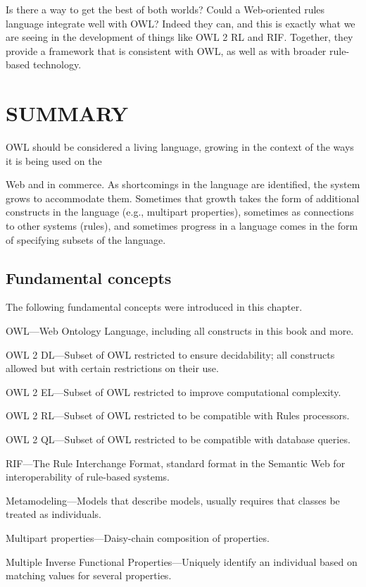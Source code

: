 Is there a way to get the best of both worlds? Could a Web-oriented
rules language integrate well with OWL? Indeed they can, and this is
exactly what we are seeing in the development of things like OWL 2 RL
and RIF. Together, they provide a framework that is consistent with OWL,
as well as with broader rule-based technology.

\section{SUMMARY}

OWL should be considered a living language, growing in the context of
the ways it is being used on the

Web and in commerce. As shortcomings in the language are identified, the
system grows to
accommodate them. Sometimes that growth takes the form of additional
constructs in the language (e.g., multipart properties), sometimes as
connections to other systems (rules), and sometimes progress in a
language comes in the form of specifying subsets of the language.

\subsection{Fundamental concepts}

The following fundamental concepts were introduced in this chapter.

OWL---Web Ontology Language, including all constructs in this book and
more.

OWL 2 DL---Subset of OWL restricted to ensure decidability; all
constructs allowed but with certain restrictions on their use.

OWL 2 EL---Subset of OWL restricted to improve computational complexity.

OWL 2 RL---Subset of OWL restricted to be compatible with Rules
processors.

OWL 2 QL---Subset of OWL restricted to be compatible with database
queries.

RIF---The Rule Interchange Format, standard format in the Semantic Web
for interoperability of rule-based systems.

Metamodeling---Models that describe models, usually requires that
classes be treated as individuals.

Multipart properties---Daisy-chain composition of properties.

Multiple Inverse Functional Properties---Uniquely identify an individual
based on matching values for several properties.
